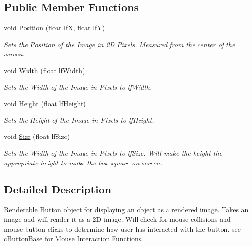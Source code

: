 \subsection*{Public Member Functions}
\begin{DoxyCompactItemize}
\item 
\hypertarget{classc_button_a3b61f8df02def1ec8ec86f4429c39022}{
void \hyperlink{classc_button_a3b61f8df02def1ec8ec86f4429c39022}{Position} (float lfX, float lfY)}
\label{classc_button_a3b61f8df02def1ec8ec86f4429c39022}

\begin{DoxyCompactList}\small\item\em Sets the Position of the Image in 2D Pixels. Measured from the center of the screen. \end{DoxyCompactList}\item 
\hypertarget{classc_button_a6b5a847fa39c2b54fa8aa93e96b34a57}{
void \hyperlink{classc_button_a6b5a847fa39c2b54fa8aa93e96b34a57}{Width} (float lfWidth)}
\label{classc_button_a6b5a847fa39c2b54fa8aa93e96b34a57}

\begin{DoxyCompactList}\small\item\em Sets the Width of the Image in Pixels to lfWidth. \end{DoxyCompactList}\item 
\hypertarget{classc_button_a30dd633ba50bf2fdb01d91129c19ce33}{
void \hyperlink{classc_button_a30dd633ba50bf2fdb01d91129c19ce33}{Height} (float lfHeight)}
\label{classc_button_a30dd633ba50bf2fdb01d91129c19ce33}

\begin{DoxyCompactList}\small\item\em Sets the Height of the Image in Pixels to lfHeight. \end{DoxyCompactList}\item 
\hypertarget{classc_button_ade80c2385df8d1c599bcdf647fa3cc42}{
void \hyperlink{classc_button_ade80c2385df8d1c599bcdf647fa3cc42}{Size} (float lfSize)}
\label{classc_button_ade80c2385df8d1c599bcdf647fa3cc42}

\begin{DoxyCompactList}\small\item\em Sets the Width of the Image in Pixels to lfSize. Will make the height the appropriate height to make the box square on screen. \end{DoxyCompactList}\end{DoxyCompactItemize}


\subsection{Detailed Description}
Renderable Button object for displaying an object as a rendered image. Takes an image and will render it as a 2D image. Will check for mouse collisions and mouse button clicks to determine how user has interacted with the button. see \hyperlink{classc_button_base}{cButtonBase} for Mouse Interaction Functions. 